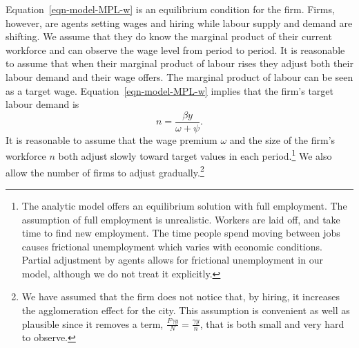 Equation~\ref{eqn-model-MPL-w} is an equilibrium condition for the firm. Firms, however,  are agents setting wages and hiring while labour supply and demand are shifting.    We assume that they do know the marginal product of their current workforce and can observe the wage level from period to period. It is reasonable to assume that when their marginal product of labour rises they adjust both their labour demand and their wage offers. The marginal product of labour can be seen as a target wage. Equation~\ref{eqn-model-MPL-w} implies that the firm's target labour demand is 
\begin{equation}
           n  = \frac{\beta y}{\omega + \psi}.
\label{eqn-labour-demand}
\end{equation}
It is reasonable to assume that the wage premium $\omega$ and the size of the firm's workforce $n$ both adjust slowly toward target values in each period.\footnote{The analytic model offers an equilibrium solution with full employment. The assumption of full employment is unrealistic. Workers are laid off, and take time to find new employment. The time people spend moving between jobs causes frictional unemployment which varies with economic conditions. Partial adjustment by agents allows for frictional unemployment in our model, although we do not treat it explicitly.}  We also allow the number of firms to adjust gradually.\footnote{We have assumed that the firm does not notice that, by hiring, it increases the agglomeration effect for the city. This assumption is convenient as well as plausible since it removes a term, $\frac{F\gamma y}{N} =\frac{\gamma y}{n}$, that is both small and very hard to observe.}





